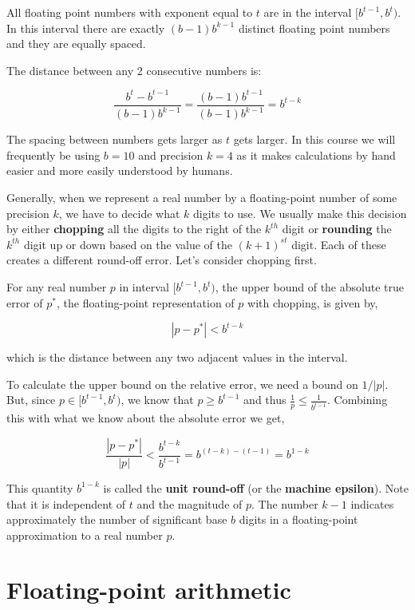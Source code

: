 \documentclass [titlepage,12pt,letter] {article}
\begin{document}
All floating point numbers with exponent equal to $t$ are in the
interval $[b^{t-1}, b^t)$. In this interval there are exactly
  $(b-1)b^{k-1}$ distinct floating point numbers and they are equally
  spaced.

The distance between any 2 consecutive numbers is: 

\begin{equation} 
\frac{b^t - b^{t-1}}{(b-1)b^{k-1}} = \frac{(b-1)b^{t-1}}{(b-1)b^{k-1}} = b^{t-k}
\end{equation} 

The spacing between numbers gets larger as $t$ gets larger. In this
course we will frequently be using $b=10$ and precision $k=4$ as it
makes calculations by hand easier and more easily understood by
humans.

Generally, when we represent a real number by a floating-point number of some precision $k$, we have to decide what $k$ digits to use. We usually make this decision by either {\bf chopping} all the digits to the right of the $k^{th}$ digit or {\bf rounding} the $k^{th}$ digit up or down based on the value of the $(k+1)^{st}$ digit. Each of these creates a different round-off error. Let's consider chopping first.

For any real number $p$ in interval $[b^{t-1},b^t)$, the upper bound of the absolute true error of $p^*$, the floating-point representation of $p$ with chopping, is given by,

\[|p-p^*|<b^{t-k}\]

\noindent
which is the distance between any two adjacent values in the interval.

To calculate the upper bound on the relative error, we need a bound on $1/|p|$. But, since $p \in [b^{t-1},b^t)$, we know that $p \ge b^{t-1}$ and thus $\frac{1}{p} \le \frac{1}{b^{t-1}}$. Combining this with what we know about the absolute error we get,

\[
\frac{|p-p^*|}{|p|} < \frac{b^{t-k}}{b^{t-1}} = b^{(t-k)-(t-1)}=b^{1-k}
\]


This quantity $b^{1-k}$ is called the {\bf unit round-off} (or the {\bf machine epsilon}). Note that it is independent of $t$ and the magnitude of $p$. The number $k-1$ indicates approximately the number of significant base $b$ digits in a floating-point approximation to a real number $p$. 


\section{Floating-point arithmetic} 
\end{document}
